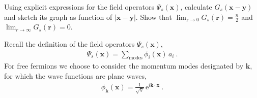 \documentclass[11pt,a4paper]{article}
\newcommand{\ee}{{\mathrm{e}}}
\newcommand{\abs}[1]{\lvert#1\rvert}
\newcommand{\boldx}{{\boldsymbol x}}
\newcommand{\boldy}{{\boldsymbol y}}
\newcommand{\boldr}{{\boldsymbol r}}
\newcommand{\boldk}{{\boldsymbol k}}
\begin{document}
\begin{exenumerate}
\item Using explicit expressions for the field operators $\Psi_s(\boldx)$, calculate $G_s(\boldx-\boldy)$ and
  sketch its graph as function of $\abs{\boldx-\boldy}$.
  Show that $\lim_{\boldr\rightarrow 0} G_s(\boldr) = \frac{n}{2}$
  and $\lim_{r\rightarrow \infty} G_s(\boldr) = 0$.
  
  \begin{loesung}
    Recall the definition of the field operators $\Psi_s(\boldx)$,
    \begin{align}
      \Psi_s(\boldx) = \sum_{\text{modes}} \phi_i(\boldx)\,a_i\ .
    \end{align}
    For free fermions we choose to consider the momentum modes designated by $\boldk$, for which the wave
    functions are plane waves,
    \begin{align}
      \phi_\boldk(\boldx) = \frac{1}{\sqrt V}\,\ee^{i\boldk\cdot\boldx}\ .
    \end{align}


\end{loesung}
\end{exenumerate}
\end{document}
